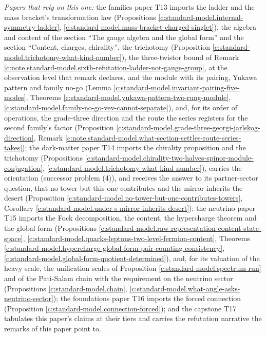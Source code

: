 \documentclass[11pt]{article}
\theoremstyle{definition}
\theoremstyle{plain}
\begin{document}
\emph{Papers that rely on this one:} the families paper T13 \cite{ButlerT13} imports the ladder and the mass bracket's transformation law (Propositions \ref{c:standard-model.internal-symmetry-ladder}, \ref{c:standard-model.mass-bracket-charged-singlet}), the algebra and content of the section ``The gauge algebra and the global form'' and the section ``Content, charges, chirality'', the trichotomy (Proposition \ref{c:standard-model.trichotomy-what-kind-number}), the three-twistor bound of Remark \ref{c:note.standard-model.sixth-refutation-ladder-not-gauge-group}, at the observation level that remark declares, and the module with its pairing, Yukawa pattern and family no-go (Lemma \ref{c:standard-model.invariant-pairing-five-modes}, Theorems \ref{c:standard-model.yukawa-pattern-two-rung-module}, \ref{c:standard-model.family-no-go-vev-cannot-separate}), and, for its order of operations, the grade-three direction and the route the series registers for the second family's factor (Proposition \ref{c:standard-model.grade-three-georgi-jarlskog-direction}, Remark \ref{c:note.standard-model.what-section-settles-route-series-takes}); the dark-matter paper T14 \cite{ButlerT14} imports the chirality proposition and the trichotomy (Propositions \ref{c:standard-model.chirality-two-halves-spinor-module-conjugation}, \ref{c:standard-model.trichotomy-what-kind-number}), carries the orientation (successor problem (4)), and receives the answer to its partner-sector question, that no tower but this one contributes and the mirror inherits the desert (Proposition \ref{c:standard-model.no-tower-but-one-contributes-towers}, Corollary \ref{c:standard-model.under-s-mirror-inherits-desert}); the neutrino paper T15 \cite{ButlerT15} imports the Fock decomposition, the content, the hypercharge theorem and the global form (Propositions \ref{c:standard-model.raw-representation-content-state-space}, \ref{c:standard-model.quarks-leptons-two-level-fermion-content}, Theorems \ref{c:standard-model.hypercharge-global-form-pair-counting-consistency}, \ref{c:standard-model.global-form-quotient-determined}), and, for its valuation of the heavy scale, the unification scales of Proposition \ref{c:standard-model.spectrum-run} and of the Pati-Salam chain with the requirement on the neutrino sector (Propositions \ref{c:standard-model.chain}, \ref{c:standard-model.what-angle-asks-neutrino-sector}); the foundations paper T16 \cite{ButlerT16} imports the forced connection (Proposition \ref{c:standard-model.connection-forced}); and the capstone T17 \cite{ButlerT17} tabulates this paper's claims at their tiers and carries the refutation narrative the remarks of this paper point to.
\end{document}
